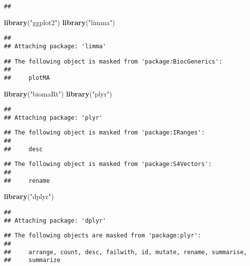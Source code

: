 \documentclass[
]{article}
\newenvironment{Shaded}{\begin{snugshade}}{\end{snugshade}}
\newcommand{\KeywordTok}[1]{\textcolor[rgb]{0.13,0.29,0.53}{\textbf{#1}}}
\newcommand{\NormalTok}[1]{#1}
\newcommand{\StringTok}[1]{\textcolor[rgb]{0.31,0.60,0.02}{#1}}
\begin{document}
\begin{verbatim}
## 
\end{verbatim}

\begin{Shaded}
\begin{Highlighting}[]
\KeywordTok{library}\NormalTok{(}\StringTok{"ggplot2"}\NormalTok{)}
\KeywordTok{library}\NormalTok{(}\StringTok{"limma"}\NormalTok{)}
\end{Highlighting}
\end{Shaded}

\begin{verbatim}
## 
## Attaching package: 'limma'
\end{verbatim}

\begin{verbatim}
## The following object is masked from 'package:BiocGenerics':
## 
##     plotMA
\end{verbatim}

\begin{Shaded}
\begin{Highlighting}[]
\KeywordTok{library}\NormalTok{(}\StringTok{"biomaRt"}\NormalTok{)}
\KeywordTok{library}\NormalTok{(}\StringTok{"plyr"}\NormalTok{)}
\end{Highlighting}
\end{Shaded}

\begin{verbatim}
## 
## Attaching package: 'plyr'
\end{verbatim}

\begin{verbatim}
## The following object is masked from 'package:IRanges':
## 
##     desc
\end{verbatim}

\begin{verbatim}
## The following object is masked from 'package:S4Vectors':
## 
##     rename
\end{verbatim}

\begin{Shaded}
\begin{Highlighting}[]
\KeywordTok{library}\NormalTok{(}\StringTok{"dplyr"}\NormalTok{)}
\end{Highlighting}
\end{Shaded}

\begin{verbatim}
## 
## Attaching package: 'dplyr'
\end{verbatim}

\begin{verbatim}
## The following objects are masked from 'package:plyr':
## 
##     arrange, count, desc, failwith, id, mutate, rename, summarise,
##     summarize
\end{verbatim}
\end{document}
